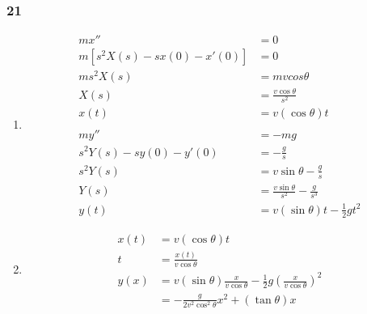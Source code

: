 \documentclass{article}
\begin{document}
\subsubsection{21}

\begin{enumerate}
  \item

        \begin{align*}
          m x''                         & = 0                                         \\
          m [s^2 X(s) - s x(0) - x'(0)] & = 0                                         \\
          m s^2 X(s)                    & = m v cos \theta                            \\
          X(s)                          & = \frac{v \cos \theta}{s^2}                 \\
          x(t)                          & = v (\cos \theta) t                         \\ \\
          m y''                         & = -m g                                      \\
          s^2 Y(s) - s y(0) - y'(0)     & = -\frac{g}{s}                              \\
          s^2 Y(s)                      & = v \sin \theta - \frac{g}{s}               \\
          Y(s)                          & = \frac{v \sin \theta}{s^2} - \frac{g}{s^3} \\
          y(t)                          & = v (\sin \theta) t - \frac{1}{2} g t^2
        \end{align*}

  \item

        \begin{align*}
          x(t) & = v (\cos \theta) t                                                                                \\
          t    & = \frac{x(t)}{v \cos \theta}                                                                       \\
          y(x) & = v (\sin \theta) \frac{x}{v \cos \theta} - \frac{1}{2} g \left( \frac{x}{v \cos \theta} \right)^2 \\
               & = -\frac{g}{2 v^2 \cos^2 \theta} x^2 + (\tan \theta) x
        \end{align*}


\end{enumerate}
\end{document}
